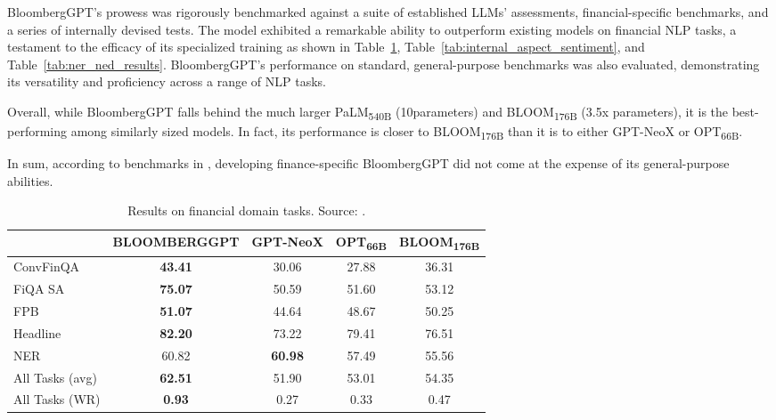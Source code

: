 BloombergGPT's prowess was rigorously benchmarked against a suite of established LLMs' assessments, financial-specific benchmarks, and a series of internally devised tests.
The model exhibited a remarkable ability to outperform existing models on financial NLP tasks, a testament to the efficacy of its specialized training as shown in Table~\ref{tab:financial_tasks}, Table~\ref{tab:internal_aspect_sentiment}, and Table~\ref{tab:ner_ned_results}.
BloombergGPT's performance on standard, general-purpose benchmarks was also evaluated, demonstrating its versatility and proficiency across a range of NLP tasks.

Overall, while BloombergGPT falls behind the much larger PaLM\textsubscript{540B} (10\texttimes parameters) and BLOOM\textsubscript{176B} (3.5x parameters), it is the best-performing among similarly sized models.
In fact, its performance is closer to BLOOM\textsubscript{176B} than it is to either GPT-NeoX or OPT\textsubscript{66B}.

In sum, according to benchmarks in \textcite{wu2023bloomberggpt}, developing finance-specific BloombergGPT did not come at the expense of its general-purpose abilities.


\begin{table}[h]
	\begin{tabularx}{\textwidth}{Xcccc}
		\toprule
		                & \textbf{BLOOMBERGGPT} & \textbf{GPT-NeoX} & \textbf{OPT\textsubscript{66B}} & \textbf{BLOOM\textsubscript{176B}} \\
		\midrule
		ConvFinQA       & \textbf{43.41}        & 30.06             & 27.88                           & 36.31                              \\
		FiQA SA         & \textbf{75.07}        & 50.59             & 51.60                           & 53.12                              \\
		FPB             & \textbf{51.07}        & 44.64             & 48.67                           & 50.25                              \\
		Headline        & \textbf{82.20}        & 73.22             & 79.41                           & 76.51                              \\
		NER             & 60.82                 & \textbf{60.98}    & 57.49                           & 55.56                              \\
		\midrule
		All Tasks (avg) & \textbf{62.51}        & 51.90             & 53.01                           & 54.35                              \\
		All Tasks (WR)  & \textbf{0.93}         & 0.27              & 0.33                            & 0.47                               \\
		\bottomrule
	\end{tabularx}
	\caption{Results on financial domain tasks. Source: \textcite{wu2023bloomberggpt}.}
	\label{tab:financial_tasks}
\end{table}

